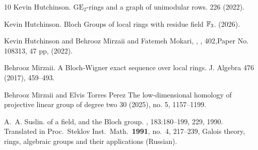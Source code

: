 \documentclass[12pt]{amsart}
\theoremstyle{definition}
\newcommand{\F}[1]{\Bbb{F}_{#1}}
\newcommand{\<}{\langle}
\renewcommand{\>}{\rangle}
\begin{document}
\begin{thebibliography}{10}
Kevin Hutchinson.
\newblock $\mathrm{GE}_2$-rings and a graph of unimodular rows.
 226 (2022).

Kevin Hutchinson.
\newblock Bloch Groups of local rings with residue field $\F{3}$.
 (2026).

 {Kevin Hutchinson and Behrooz Mirzaii and  Fatemeh Mokari},
 ,
  , {402},Paper No. 108313, 47 pp, {(2022)}.

Behrooz Mirzaii.
\newblock A Bloch-Wigner exact sequence over local rings.
\newblock J. Algebra 476 (2017), 459–493.

Behrooz Mirzaii and Elvis Torres Perez
\newblock  The low-dimensional homology of projective linear group of degree two
 30 (2025), no. 5, 1157–1199.







A.~A. Suslin.
 of a field, and the {B}loch group.
, 183:180--199, 229, 1990.
\newblock Translated in Proc.\ Steklov Inst.\ Math.\ {\bf 1991}, no.\ 4,
  217--239, Galois theory, rings, algebraic groups and their applications
  (Russian).

\end{thebibliography}
\end{document}
